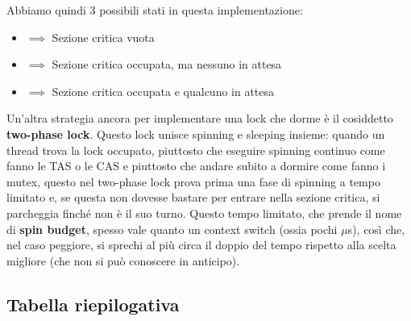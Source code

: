 \documentclass[11pt, a4paper, titlepage, oneside]{scrbook}
\begin{document}
Abbiamo quindi 3 possibili stati in questa implementazione:
\begin{itemize}
    \item {} $\implies$ Sezione critica vuota
    \item {} $\implies$ Sezione critica occupata, ma nessuno in attesa
    \item {} $\implies$ Sezione critica occupata e qualcuno in attesa
\end{itemize}

Un'altra strategia ancora per implementare una lock che dorme è il cosiddetto \textbf{two-phase lock}. Questo lock unisce spinning e sleeping insieme: quando un thread trova la lock occupato, piuttosto che eseguire spinning continuo come fanno le TAS o le CAS e piuttosto che andare subito a dormire come fanno i mutex, questo nel two-phase lock prova prima una fase di spinning a tempo limitato e, se questa non dovesse bastare per entrare nella sezione critica, si parcheggia finché non è il suo turno. Questo tempo limitato, che prende il nome di \textbf{spin budget}, spesso vale quanto un context switch (ossia pochi $\mu$s), così che, nel caso peggiore, si sprechi al più circa il doppio del tempo rispetto alla scelta migliore (che non si può conoscere in anticipo).

\subsection{Tabella riepilogativa}
\end{document}
